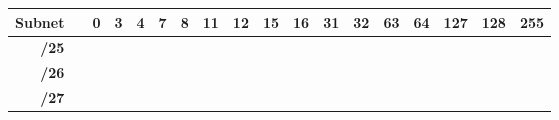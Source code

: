 \documentclass[11pt,a4paper]{report}
\begin{document}
\begin{center}
\begin{longtable}{rlcccccccccccccccc}
            \multicolumn{1}{c}{\multirow{-2}{*}{\textbf{Subnet}}}                                                    &                       & \cellcolor[HTML]{C09FE5}0 & \cellcolor[HTML]{C09FE5}3 & \cellcolor[HTML]{C09FE5}4 & \cellcolor[HTML]{C09FE5}7 & \cellcolor[HTML]{C09FE5}8 & \cellcolor[HTML]{C09FE5}11 & \cellcolor[HTML]{C09FE5}12 & \cellcolor[HTML]{C09FE5}15 & \cellcolor[HTML]{BFBFBF}16      & \cellcolor[HTML]{BFBFBF}31      & \cellcolor[HTML]{FFD966}32      & \cellcolor[HTML]{FFD966}63      & \cellcolor[HTML]{A9D08E}64      & \cellcolor[HTML]{A9D08E}127     & \cellcolor[HTML]{F4B084}128      & \cellcolor[HTML]{F4B084}255     \\ \cline{1-1} \cline{3-18}
            \endhead
            \textbf{/25}                                                                                             &                       &                           &                           &                           &                           &                           &                            &                            &                            &                                 &                                 &                                 &                                 &                                 &                                 & \cellcolor[HTML]{F4B084}         & \cellcolor[HTML]{F4B084}        \\ \cline{3-18}
            \textbf{/26}                                                                                             &                       &                           &                           &                           &                           &                           &                            &                            &                            &                                 &                                 &                                 &                                 & \cellcolor[HTML]{A9D08E}        & \cellcolor[HTML]{A9D08E}        &                                  &                                 \\ \cline{3-18}
            \textbf{/27}                                                                                             &                       &                           &                           &                           &                           &                           &                            &                            &                            &                                 &                                 & \cellcolor[HTML]{FFD966}        & \cellcolor[HTML]{FFD966}        &                                 &                                 &                                  &                                 \\ \cline{3-18}

\end{longtable}
\end{center}
\end{document}
